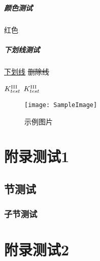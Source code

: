 \documentclass{../../PublicResources/DocClassLight}
\begin{document}
    \paragraph{\color{black}颜色测试}
    {\color{red} 红色}

    \paragraph{下划线测试}
    \uline{下划线}
    \sout{删除线}


     $K_{test}^{\text{\Rmnum{3}}}$ $K_{test}^{\mathrm{\Rmnum{3}}}$

    \newpage
    \begin{figure}[h!]
        \centering
        \texttt{[image: SampleImage]}
        \caption{示例图片}
    \end{figure}

    \nocite{*} %
    \printbibliography %

    \appendix
    \chapter{附录测试1}
    \section{节测试}
    \subsection{子节测试}
    \chapter{附录测试2}
\end{document}
